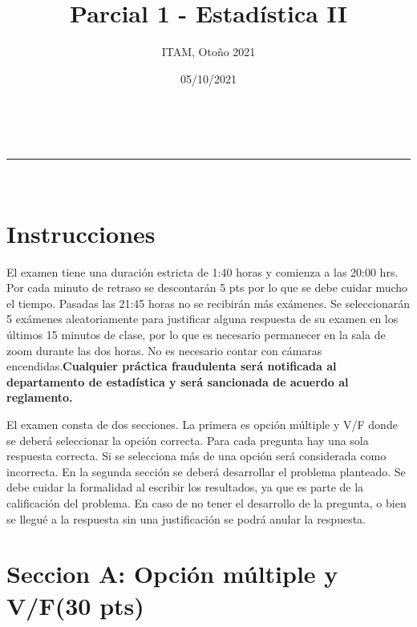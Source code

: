 \documentclass[addpoints]{exam}
\makeatletter
\newcommand{\linia}{\rule{\linewidth}{0.5pt}}
\theoremstyle{mytheor}
\renewcommand{\maketitle}{
    \begin{center}
    \vspace{2ex}
    {\huge \textsc{\@title}}
    \vspace{1ex}
    \\
    \linia\\
    \@author \hfill \@date
    \vspace{4ex}
    \end{center}
  }
\makeatother
\begin{document}
  
  \title{Parcial 1 - Estadística II}
  
  \author{ITAM, Otoño 2021}
  
  \date{05/10/2021}
  
  \maketitle
  
  \section*{Instrucciones}
  
  
El examen tiene una duración estricta de 1:40 horas y comienza a las 20:00 hrs. Por cada minuto de retraso se descontarán 5 pts por lo que se debe cuidar mucho el tiempo. Pasadas las 21:45 horas no se recibirán más exámenes. Se seleccionarán 5 exámenes aleatoriamente para justificar alguna respuesta de su examen en los últimos 15 minutos de clase, por lo que es necesario permanecer en la sala de zoom durante las dos horas. No es necesario contar con cámaras encendidas.\textbf{Cualquier práctica fraudulenta será notificada al departamento de estadística y será sancionada de acuerdo al reglamento.} 

El examen consta de dos secciones. La primera es opción múltiple y V/F donde se deberá seleccionar la opción correcta. Para cada pregunta hay una sola respuesta correcta. Si se selecciona más de una opción será considerada como incorrecta. En la segunda sección se deberá desarrollar el problema planteado. Se debe cuidar la formalidad al escribir los resultados, ya que es parte de la calificación del problema. En caso de no tener el desarrollo de la pregunta, o bien se llegué a la respuesta sin una justificación se podrá anular la respuesta. 
  
  \vspace{10pt}

  
  \section*{Seccion A: Opción múltiple y V/F(30 pts)}
  
\end{document}
